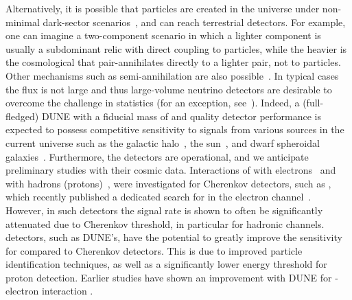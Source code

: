 Alternatively, it is possible that  particles are created in the universe under non-minimal dark-sector scenarios~\cite{Agashe:2014yua,
Belanger:2011ww}, and can reach terrestrial detectors. 
For example, one can imagine a two-component  scenario in which a lighter component is usually a subdominant relic with direct coupling to  particles, while the heavier is the cosmological  that pair-annihilates directly to a lighter  pair, not to  particles. Other mechanisms such as semi-annihilation are also possible~\cite{Carlson:1992fn, Hochberg:2014dra,Huang:2013xfa,Berger:2014sqa,Kong:2014mia}.
In typical cases the  flux is not large and thus large-volume neutrino detectors are desirable %
to overcome the challenge in statistics (for an  exception, see~\cite{Cherry:2015oca, Cui:2017ytb}).
Indeed, a (full-fledged) DUNE  with a fiducial mass of \fdfiducialmass and quality detector performance is expected to possess competitive sensitivity to  signals from various sources in the current universe such as the galactic halo~\cite{Agashe:2014yua,
Alhazmi:2016qcs,Kim:2016zjx,Giudice:2017zke,Chatterjee:2018mej,Kim:2018veo}, the sun~\cite{Huang:2013xfa,Berger:2014sqa,Kong:2014mia,Kim:2018veo}, and dwarf spheroidal galaxies~\cite{Necib:2016aez}.
Furthermore, the  detectors %
are operational, and we anticipate preliminary studies with their cosmic data. Interactions of  with electrons~\cite{Agashe:2014yua} 
and with hadrons (protons)~\cite{Berger:2014sqa}, were investigated for Cherenkov detectors, such as \superk, which recently published a dedicated search for  in the electron channel~\cite{Kachulis:2017nci}. However, in such detectors the  signal rate is shown to often be significantly attenuated due to Cherenkov threshold, in particular for hadronic channels.  \lar detectors, such as DUNE's, have the potential to greatly improve the sensitivity for  compared to Cherenkov detectors. This is due to improved particle identification techniques, as well as a significantly lower energy threshold for proton detection. Earlier studies have shown an improvement with DUNE for -electron interaction \cite{Necib:2016aez}.

